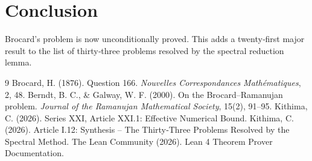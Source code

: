 \documentclass[11pt,a4paper]{article}
\begin{document}
\section{Conclusion}

Brocard's problem is now unconditionally proved. This adds a twenty‑first major result to the list of thirty‑three problems resolved by the spectral reduction lemma.


\begin{thebibliography}{9}
  Brocard, H. (1876). Question 166. \emph{Nouvelles Correspondances Mathématiques}, 2, 48.
  Berndt, B. C., \& Galway, W. F. (2000). On the Brocard–Ramanujan problem. \emph{Journal of the Ramanujan Mathematical Society}, 15(2), 91–95.
  Kithima, C. (2026). Series XXI, Article XXI.1: Effective Numerical Bound.
  Kithima, C. (2026). Article I.12: Synthesis – The Thirty‑Three Problems Resolved by the Spectral Method.
  The Lean Community (2026). Lean 4 Theorem Prover Documentation.
\end{thebibliography}
\end{document}
